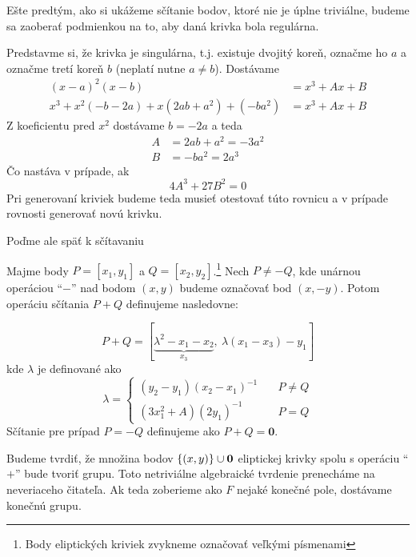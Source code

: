 Ešte predtým, ako si ukážeme sčítanie bodov, ktoré nie je úplne
triviálne, budeme sa zaoberať podmienkou na to, aby daná krivka bola
regulárna.

Predstavme si, že krivka je singulárna, t.j. existuje dvojitý koreň,
označme ho $a$ a označme tretí koreň $b$ (neplatí nutne $a\ne b$).
Dostávame
\begin{align*}
    (x-a)^2 (x-b) &= x^3 + Ax + B \\
    x^3 + x^2 (-b -2a) + x (2ab + a^2) + (-b a^2) &= x^3 + Ax + B
\end{align*}
Z koeficientu pred $x^2$ dostávame $b=-2a$ a teda
\begin{align*}
    A &= 2ab + a^2 = -3 a^2 \\
    B &= -b a^2 = 2 a^3
\end{align*}
Čo nastáva v prípade, ak
\begin{equation*}
    4 A^3 + 27 B^2 = 0
\end{equation*}
Pri generovaní kriviek budeme teda musieť otestovať túto rovnicu a v
prípade rovnosti generovať novú krivku.

Poďme ale späť k sčítavaniu
\begin{definicia}
    Majme body $P=[x_1,y_1]$ a $Q=[x_2,y_2]$.\footnote{Body
        eliptických kriviek zvykneme označovať veľkými písmenami}
    Nech $P \ne -Q$, kde unárnou operáciou ``$-$'' nad bodom
    $(x,y)$ budeme označovať bod $(x,-y)$.
    Potom operáciu sčítania $P+Q$ definujeme nasledovne:

    \begin{equation*}
        P+Q = [ \underbrace{\lambda^2 - x_1 - x_2}_{x_3}, \ 
            \lambda (x_1 - x_3) - y_1]
    \end{equation*}
    kde $\lambda$ je definované ako
    \begin{equation*}
        \lambda =
            \begin{cases}
                (y_2 -y_1)(x_2 - x_1)^{-1} \quad & P \ne Q \\
                (3 x_1^2 + A)(2 y_1)^{-1} \quad & P = Q
            \end{cases}
    \end{equation*}
    Sčítanie pre prípad $P = -Q$ definujeme ako $P+Q=\mathbf{0}$.
\end{definicia}

Budeme tvrdiť, že množina bodov $\{(x,y)\} \cup \mathbf{0}$
eliptickej krivky spolu s operáciu ``$+$'' bude tvoriť grupu. Toto
netriviálne algebraické tvrdenie prenecháme na neveriaceho
čitateľa. Ak teda zoberieme ako $F$ nejaké konečné
pole, dostávame konečnú grupu.

